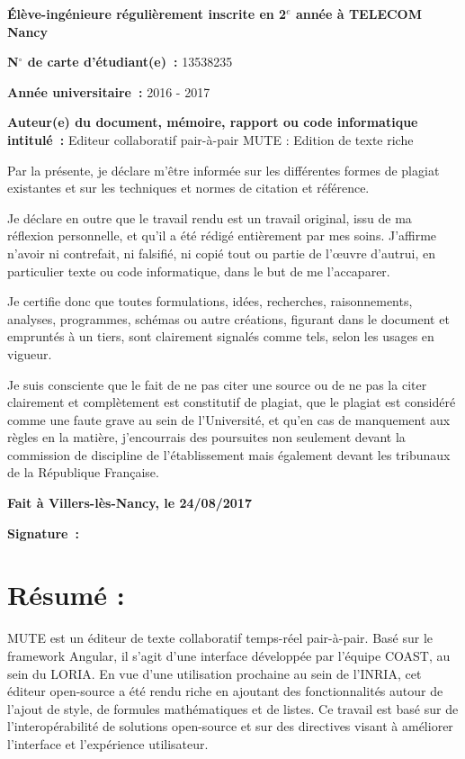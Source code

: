 \documentclass[12pt]{article}
\begin{document}
\textbf{\'{E}lève-ingénieure régulièrement inscrite en 2$^{e}$
année à TELECOM Nancy}

\textbf{N$^\circ{}$ de carte d'étudiant(e)~:} 13538235

\textbf{Année universitaire~:} 2016 - 2017

\textbf{Auteur(e) du document, m\'{e}moire, rapport ou code informatique
intitul\'{e}~:} Editeur collaboratif pair-à-pair MUTE : Edition de texte riche



Par la présente, je déclare m'être informée sur les
différentes formes de plagiat existantes et sur les techniques et normes de
citation et référence.

Je déclare en outre que le travail rendu est un travail original, issu de ma
réflexion personnelle, et qu'il a été rédigé entièrement
par mes soins. J'affirme n'avoir ni contrefait, ni falsifié, ni copié
tout ou partie de l'\oe{}uvre d'autrui, en particulier texte ou code
informatique, dans le but de me l'accaparer.

Je certifie donc que toutes formulations, idées, recherches, raisonnements,
analyses, programmes, schémas ou autre créations, figurant dans le
document et empruntés à un tiers, sont clairement signalés comme
tels, selon les usages en vigueur.

Je suis consciente que le fait de ne pas citer une source ou de ne pas la
citer clairement et complètement est constitutif de plagiat, que le plagiat est
considéré comme une faute grave au sein de l'Université, et qu'en cas
de manquement aux règles en la matière, j'encourrais des poursuites non
seulement devant la commission de discipline de l'établissement mais
également devant les tribunaux de la République Française.

\begin{center}
\textbf{Fait à Villers-lès-Nancy, le 24/08/2017}
\end{center}
\thispagestyle{empty}

\begin{center}
\textbf{Signature~:}
\end{center}

\newpage
\thispagestyle{empty}
\section*{Résumé :}
MUTE est un éditeur de texte collaboratif temps-réel pair-à-pair. Basé sur le framework Angular, il s'agit d'une interface développée par l'équipe COAST, au sein du LORIA. En vue d'une utilisation prochaine au sein de l'INRIA, cet éditeur open-source a été rendu riche en ajoutant des fonctionnalités autour de l'ajout de style, de formules mathématiques et de listes. Ce travail est basé sur de l'interopérabilité de solutions open-source et sur des directives visant à améliorer l'interface et l'expérience utilisateur.
\end{document}
